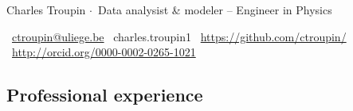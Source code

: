 \documentclass[svgnames]{article}
\newcommand{\sepa}{$\cdot$~}
\begin{document}
\pagestyle{empty}

{\LARGE Charles {\sc Troupin}} {\large \sepa Data analysist \& modeler --  Engineer in Physics}
\vspace{.25cm}

\faEnvelope~\href{mailto:ctroupin@uliege.be}{ctroupin@uliege.be}\hspace{.25cm} \faSkype~charles.troupin1 \hspace{.25cm}\faGithubSquare~\url{https://github.com/ctroupin/}  \hspace{.25cm}\aiOrcidSquare~\url{http://orcid.org/0000-0002-0265-1021} 

\subsection*{Professional experience}
\end{document}
